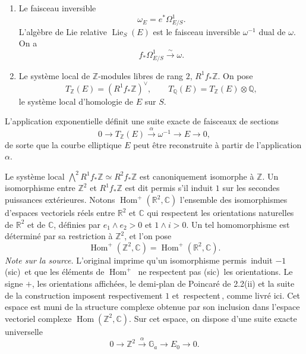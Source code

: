 \documentclass[10pt]{article}
\newcommand{\C}{\mathbb C}
\newcommand{\Q}{\mathbb Q}
\newcommand{\R}{\mathbb R}
\newcommand{\Z}{\mathbb Z}
\newcommand{\Ga}{\mathbb G_a}
\newcommand{\Hom}{\operatorname{Hom}}
\newcommand{\Lie}{\operatorname{Lie}}
\newcommand{\frquote}[1]{\guillemotleft{}\,#1\,\guillemotright{}}
\begin{document}
\begin{enumerate}[label=(\alph*)]
\item Le faisceau inversible
\[
\omega_E=e^*\Omega^1_{E/S}.
\]
L'algèbre de Lie relative $\Lie_S(E)$ est le faisceau inversible $\omega^{-1}$ dual de
$\omega$. On a
\[
f_*\Omega^1_{E/S}\xrightarrow{\sim}\omega .
\]

\item Le système local de $\Z$-modules libres de rang $2$, $R^1f_*\Z$. On pose
\[
T_\Z(E)=(R^1f_*\Z)^\vee,\qquad
T_\Q(E)=T_\Z(E)\otimes\Q,
\]
le système local d'homologie de $E$ sur $S$.
\end{enumerate}

L'application exponentielle définit une suite exacte de faisceaux de sections
\[
0\longrightarrow T_\Z(E)\xrightarrow{\alpha}\omega^{-1}\longrightarrow E\longrightarrow 0,
\]
de sorte que la courbe elliptique $E$ peut être reconstruite à partir de l'application
$\alpha$.

Le système local $\bigwedge^2 R^1f_*\Z\simeq R^2f_*\Z$ est canoniquement isomorphe
à $\Z$. Un isomorphisme entre $\Z^2$ et $R^1f_*\Z$ est dit permis s'il induit $1$ sur
les secondes puissances extérieures. Notons $\Hom^+(\R^2,\C)$ l'ensemble des
isomorphismes d'espaces vectoriels réels entre $\R^2$ et $\C$ qui respectent les orientations
naturelles de $\R^2$ et de $\C$, définies par $e_1\wedge e_2>0$ et $1\wedge i>0$.
Un tel homomorphisme est déterminé par sa restriction à $\Z^2$, et l'on pose
\[
\Hom^+(\Z^2,\C)=\Hom^+(\R^2,\C).
\]
\noindent\emph{Note sur la source.} L'original imprime qu'un isomorphisme permis
\frquote{induit $-1$ (sic)} et que les éléments de $\Hom^+$ \frquote{ne respectent pas
(sic)} les orientations. Le signe $+$, les orientations affichées, le demi-plan de
Poincaré de 2.2(ii) et la suite de la construction imposent respectivement $1$ et
\frquote{respectent}, comme livré ici.
Cet espace est muni de la structure complexe obtenue par son inclusion dans l'espace
vectoriel complexe $\Hom(\Z^2,\C)$. Sur cet espace, on dispose d'une suite exacte
\frquote{universelle}
\[
0\longrightarrow \Z^2\xrightarrow{\alpha}\Ga\longrightarrow E_0\longrightarrow 0.
\]
\end{document}
